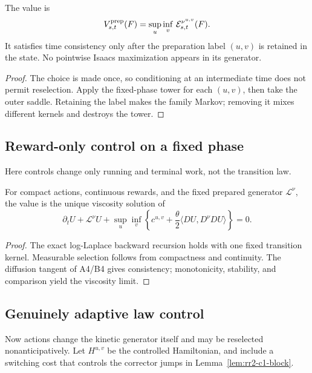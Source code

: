 \begin{theorem}
\label{thm:rr2-c1-outer}
The value is
\[
 V^{\rm prep}_{s,t}(F)
 =
 \sup_u\inf_v\,
 \mathcal E_{s,t}^{\nu^{u,v}}(F).
\]
It satisfies time consistency only after the preparation label \((u,v)\) is
retained in the state.  No pointwise Isaacs maximization appears in its
generator.
\end{theorem}

\begin{proof}
The choice is made once, so conditioning at an intermediate time does not
permit reselection.  Apply the fixed-phase tower for each \((u,v)\), then
take the outer saddle.  Retaining the label makes the family Markov; removing
it mixes different kernels and destroys the tower.
\end{proof}

\subsection{Reward-only control on a fixed phase}

Here controls change only running and terminal work, not the transition law.

\begin{theorem}
\label{thm:rr2-c1-reward}
For compact actions, continuous rewards, and the fixed prepared generator
\(\mathcal L^\nu\), the value is the unique viscosity solution of
\[
 \partial_tU+\mathcal L^\nu U+
 \sup_u\inf_v
 \left\{c^{u,v}
 +\frac{\theta}{2}
 \langle DU,D^\nu DU\rangle\right\}=0.
\]
\end{theorem}

\begin{proof}
The exact log-Laplace backward recursion holds with one fixed transition
kernel.  Measurable selection follows from compactness and continuity.
The diffusion tangent of A4/B4 gives consistency; monotonicity, stability,
and comparison yield the viscosity limit.
\end{proof}

\subsection{Genuinely adaptive law control}

Now actions change the kinetic generator itself and may be reselected
nonanticipatively.  Let \(H^{u,v}\) be the controlled Hamiltonian, and include
a switching cost that controls the corrector jumps in
Lemma~\ref{lem:rr2-c1-block}.

